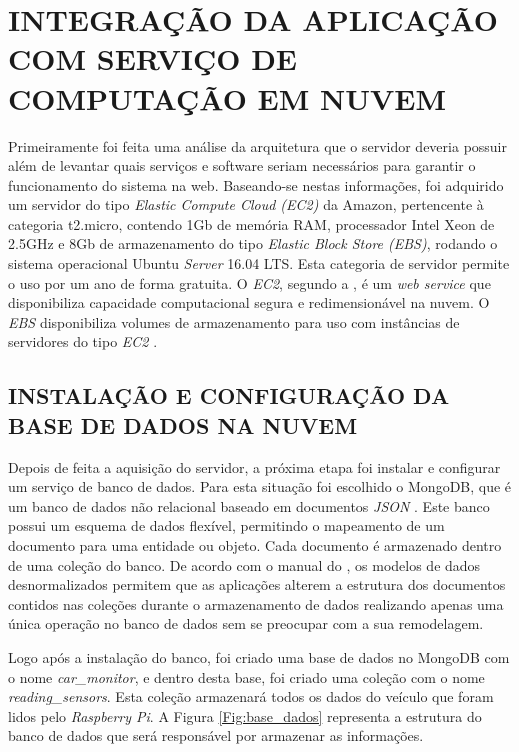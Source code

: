 \section{INTEGRAÇÃO DA APLICAÇÃO COM SERVIÇO DE COMPUTAÇÃO EM NUVEM}
Primeiramente foi feita uma análise da arquitetura que o servidor deveria possuir além de levantar quais serviços e software seriam necessários para garantir o funcionamento do sistema na web. Baseando-se nestas informações, foi adquirido um servidor do tipo \textit{Elastic Compute Cloud (EC2)} da Amazon, pertencente à categoria t2.micro, contendo 1Gb de memória RAM, processador Intel Xeon de 2.5GHz e 8Gb de armazenamento do tipo \textit{Elastic Block Store (EBS)}, rodando o sistema operacional Ubuntu \textit{Server} 16.04 LTS. Esta categoria de servidor permite o uso por um ano de forma gratuita. O \textit{EC2}, segundo a , é um \textit{web service} que disponibiliza capacidade computacional segura e redimensionável na nuvem. O \textit{EBS} disponibiliza volumes de armazenamento para uso com instâncias de servidores do tipo \textit{EC2} \nocite{amazonebs}.

\subsection{INSTALAÇÃO E CONFIGURAÇÃO DA BASE DE DADOS NA NUVEM}
Depois de feita a aquisição do servidor, a próxima etapa foi instalar e configurar um serviço de banco de dados. Para esta situação foi escolhido o MongoDB, que é um banco de dados não relacional baseado em documentos \textit{JSON} \cite{mongodbwhatis}. Este banco possui um esquema de dados flexível, permitindo o mapeamento de um documento para uma entidade ou objeto. Cada documento é armazenado dentro de uma coleção do banco. De acordo com o manual do , os modelos de dados desnormalizados permitem que as aplicações alterem a estrutura dos documentos contidos nas coleções durante o armazenamento de dados realizando apenas uma única operação no banco de dados sem se preocupar com a sua remodelagem.

Logo após a instalação do banco, foi criado uma base de dados no MongoDB com o nome \textit{car\_monitor}, e dentro desta base, foi criado uma coleção com o nome \textit{reading\_sensors}. Esta coleção armazenará todos os dados do veículo que foram lidos pelo \textit{Raspberry Pi}. A Figura \ref{Fig:base_dados} representa a estrutura do banco de dados que será responsável por armazenar as informações.

